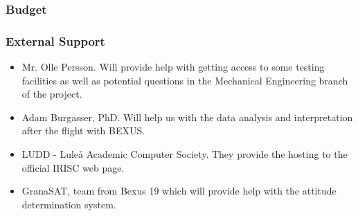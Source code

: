 \newpage
\subsubsection{Budget}
\label{sec:3.2.2}





\subsubsection{External Support}

\begin{itemize}
	\item Mr. Olle Persson. Will provide help with getting access to some testing facilities as well as potential questions in the Mechanical Engineering branch of the project.
	\item Adam Burgasser, PhD. Will help us with the data analysis and interpretation after the flight with BEXUS.
	\item LUDD - Luleå Academic Computer Society. They provide the hosting to the official IRISC web page.
	\item GranaSAT, team from Bexus 19 which will provide help with the attitude determination system.
\end{itemize}
